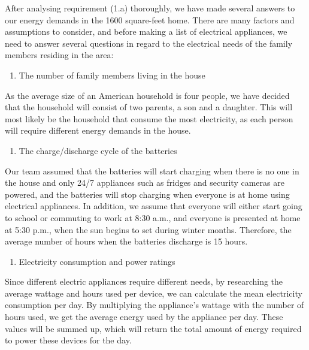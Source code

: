 After analysing requirement (1.a) thoroughly, we have made several answers to our energy demands in the 1600 square-feet home. There are many factors and assumptions to consider, and before making a list of electrical appliances, we need to answer several questions in regard to the electrical needs of the family members residing in the area:
\begin{enumerate}
    \item The number of family members living in the house
\end{enumerate}
As the average size of an American household is four people, we have decided that the household will consist of two parents, a son and a daughter. This will most likely be the household that consume the most electricity, as each person will require different energy demands in the house.
\begin{enumerate}[resume]
    \item The charge/discharge cycle of the batteries
\end{enumerate}
Our team assumed that the batteries will start charging when there is no one in the house and only 24/7 appliances such as fridges and security cameras are powered, and the batteries will stop charging when everyone is at home using electrical appliances. In addition, we assume that everyone will either start going to school or commuting to work at 8:30 a.m., and everyone is presented at home at 5:30 p.m., when the sun begins to set during winter months. Therefore, the average number of hours when the batteries discharge is 15 hours.
\begin{enumerate}[resume]
    \item Electricity consumption and power ratings
\end{enumerate}
Since different electric appliances require different needs, by researching the average wattage and hours used per device, we can calculate the mean electricity consumption per day. By multiplying the appliance's wattage with the number of hours used, we get the average energy used by the appliance per day. These values will be summed up, which will return the total amount of energy required to power these devices for the day.